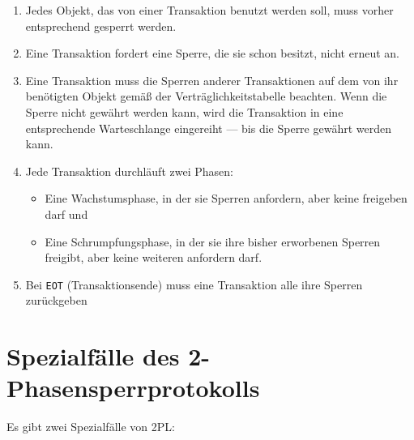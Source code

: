 \documentclass{bschlangaul-theorie}
\begin{document}
\begin{enumerate}
\item Jedes Objekt, das von einer Transaktion benutzt werden soll, muss
vorher entsprechend gesperrt werden.

\item Eine Transaktion fordert eine Sperre, die sie schon besitzt, nicht
erneut an.

\item Eine Transaktion muss die Sperren anderer Transaktionen auf dem
von ihr benötigten Objekt gemäß der Verträglichkeitstabelle beachten.
Wenn die Sperre nicht gewährt werden kann, wird die Transaktion in eine
entsprechende Warteschlange eingereiht — bis die Sperre gewährt werden
kann.

\item Jede Transaktion durchläuft zwei Phasen:

\begin{itemize}
\item Eine Wachstumsphase, in der sie Sperren anfordern, aber keine
freigeben darf und

\item Eine Schrumpfungsphase, in der sie ihre bisher erworbenen
Sperren freigibt, aber keine weiteren anfordern darf.
\end{itemize}

\item Bei \texttt{EOT} (Transaktionsende) muss eine Transaktion alle
ihre Sperren zurückgeben
\end{enumerate}

\section{Spezialfälle des 2-Phasensperrprotokolls}

Es gibt zwei Spezialfälle von 2PL:
\end{document}
